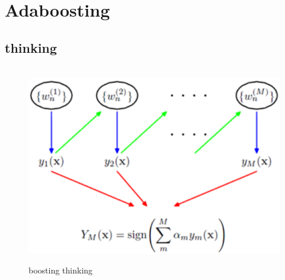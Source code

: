 \documentclass[12pt]{ctexart}%
\begin{document}
		
	\section{\quad Adaboosting}
		\subsection{\quad thinking}
			\begin{figure}[H]
				\vspace{-0.2cm}  %
				\setlength{\abovecaptionskip}{-0.2cm}   %
				\centering
				\includegraphics[scale=0.4]{boosting_thinking.png}
				\renewcommand{\figurename}{Fig} %
				\caption{boosting thinking}
				\label{fig:5}
			\end{figure}
		
\end{document}
